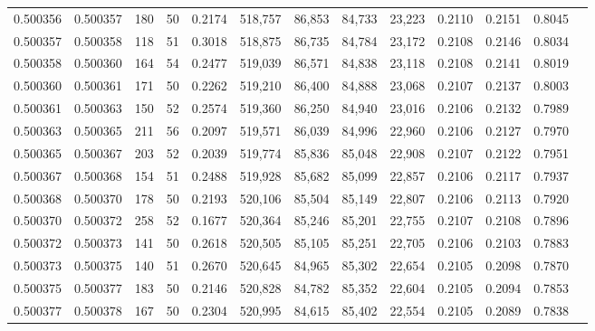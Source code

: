 \begin{tabular}{rrrrrrrrrrrrr}
0.500356 & 0.500357 & 180 &  50 &                                     0.2174 & 518,757 &  86,853 &  84,733 &  23,223 & 0.2110 & 0.2151 & 0.8045 \\
0.500357 & 0.500358 & 118 &  51 &                                     0.3018 & 518,875 &  86,735 &  84,784 &  23,172 & 0.2108 & 0.2146 & 0.8034 \\
0.500358 & 0.500360 & 164 &  54 &                                     0.2477 & 519,039 &  86,571 &  84,838 &  23,118 & 0.2108 & 0.2141 & 0.8019 \\
0.500360 & 0.500361 & 171 &  50 &                                     0.2262 & 519,210 &  86,400 &  84,888 &  23,068 & 0.2107 & 0.2137 & 0.8003 \\
0.500361 & 0.500363 & 150 &  52 &                                     0.2574 & 519,360 &  86,250 &  84,940 &  23,016 & 0.2106 & 0.2132 & 0.7989 \\
0.500363 & 0.500365 & 211 &  56 &                                     0.2097 & 519,571 &  86,039 &  84,996 &  22,960 & 0.2106 & 0.2127 & 0.7970 \\
0.500365 & 0.500367 & 203 &  52 &                                     0.2039 & 519,774 &  85,836 &  85,048 &  22,908 & 0.2107 & 0.2122 & 0.7951 \\
0.500367 & 0.500368 & 154 &  51 &                                     0.2488 & 519,928 &  85,682 &  85,099 &  22,857 & 0.2106 & 0.2117 & 0.7937 \\
0.500368 & 0.500370 & 178 &  50 &                                     0.2193 & 520,106 &  85,504 &  85,149 &  22,807 & 0.2106 & 0.2113 & 0.7920 \\
0.500370 & 0.500372 & 258 &  52 &                                     0.1677 & 520,364 &  85,246 &  85,201 &  22,755 & 0.2107 & 0.2108 & 0.7896 \\
0.500372 & 0.500373 & 141 &  50 &                                     0.2618 & 520,505 &  85,105 &  85,251 &  22,705 & 0.2106 & 0.2103 & 0.7883 \\
0.500373 & 0.500375 & 140 &  51 &                                     0.2670 & 520,645 &  84,965 &  85,302 &  22,654 & 0.2105 & 0.2098 & 0.7870 \\
0.500375 & 0.500377 & 183 &  50 &                                     0.2146 & 520,828 &  84,782 &  85,352 &  22,604 & 0.2105 & 0.2094 & 0.7853 \\
0.500377 & 0.500378 & 167 &  50 &                                     0.2304 & 520,995 &  84,615 &  85,402 &  22,554 & 0.2105 & 0.2089 & 0.7838 \\

\end{tabular}
